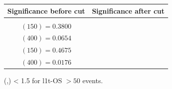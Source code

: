 \documentclass[letterpaper,12pt]{article}
\begin{document}
\begin{figure}
  \vspace{0.6cm}
  \tiny
  \setlength{\tabcolsep}{20pt}
  \renewcommand{\arraystretch}{1.6}
  \begin{tabular}{|c|c|}
    \hline
    Significance before cut & Significance after cut\\
    \hline
    \Gape[0.2cm]{\makecell{
        \sig{} $(100) = 0.2990$\\
        \sig{} $(150) = 0.3800$\\
        \sig{} $(400) = 0.0654$ }} & 
    \makecell{
      \sig{} $(100) = 0.4811$\\
      \sig{} $(150) = 0.4675$\\
      \sig{} $(400) = 0.0176$}\\
    \hline
  \end{tabular}
  \caption{\DeltaR{} (\ll,\ls) < 1.5 for \2l1t-OS \metpt $>50$ events.}
  \label{fig:2l1tc1}
\end{figure}
\clearpage
\end{document}
